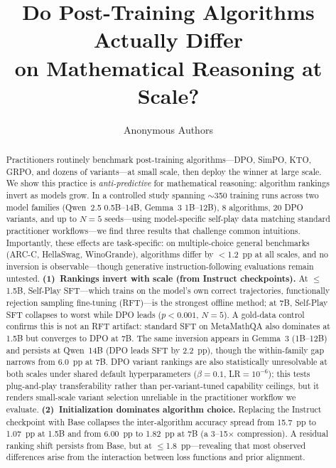 \documentclass{article}
\title{Do Post-Training Algorithms Actually Differ\\ on Mathematical Reasoning at Scale?}
\author{
  Anonymous Authors
}
\begin{document}
\maketitle

\begin{abstract}
Practitioners routinely benchmark post-training algorithms---DPO, SimPO, KTO, GRPO, and dozens of variants---at small scale, then deploy the winner at large scale.
We show this practice is \emph{anti-predictive} for mathematical reasoning: algorithm rankings invert as models grow.
In a controlled study spanning ${\sim}$350 training runs across two model families (Qwen~2.5 0.5B--14B, Gemma~3 1B--12B), 8 algorithms, 20 DPO variants, and up to $N{=}5$ seeds---using model-specific self-play data matching standard practitioner workflows---we find three results that challenge common intuitions.
Importantly, these effects are task-specific: on multiple-choice general benchmarks (ARC-C, HellaSwag, WinoGrande), algorithms differ by $<$1.2~pp at all scales, and no inversion is observable---though generative instruction-following evaluations remain untested.
\textbf{(1)~Rankings invert with scale (from Instruct checkpoints).} At $\leq$1.5B, Self-Play SFT---which trains on the model's own correct trajectories, functionally rejection sampling fine-tuning (RFT)---is the strongest offline method; at 7B, Self-Play SFT collapses to worst while DPO leads ($p < 0.001$, $N{=}5$). A gold-data control confirms this is not an RFT artifact: standard SFT on MetaMathQA also dominates at 1.5B but converges to DPO at 7B. The same inversion appears in Gemma~3 (1B--12B) and persists at Qwen~14B (DPO leads SFT by 2.2~pp), though the within-family gap narrows from 6.0~pp at 7B. DPO variant rankings are also statistically unresolvable at both scales under shared default hyperparameters ($\beta{=}0.1$, LR${=}10^{-6}$); this tests plug-and-play transferability rather than per-variant-tuned capability ceilings, but it renders small-scale variant selection unreliable in the practitioner workflow we evaluate.
\textbf{(2)~Initialization dominates algorithm choice.} Replacing the Instruct checkpoint with Base collapses the inter-algorithm accuracy spread from 15.7~pp to 1.07~pp at 1.5B and from 6.00~pp to 1.82~pp at 7B (a 3--15$\times$ compression). A residual ranking shift persists from Base, but at $\leq$1.8~pp---revealing that most observed differences arise from the interaction between loss functions and prior alignment.

\end{abstract}
\end{document}
